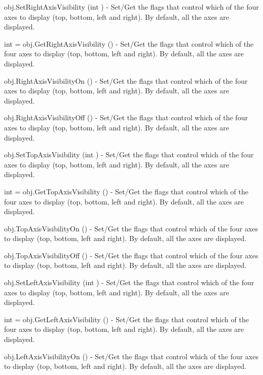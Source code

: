 \begin{DoxyItemize}
\item {\ttfamily obj.\-Set\-Right\-Axis\-Visibility (int )} -\/ Set/\-Get the flags that control which of the four axes to display (top, bottom, left and right). By default, all the axes are displayed.  
\item {\ttfamily int = obj.\-Get\-Right\-Axis\-Visibility ()} -\/ Set/\-Get the flags that control which of the four axes to display (top, bottom, left and right). By default, all the axes are displayed.  
\item {\ttfamily obj.\-Right\-Axis\-Visibility\-On ()} -\/ Set/\-Get the flags that control which of the four axes to display (top, bottom, left and right). By default, all the axes are displayed.  
\item {\ttfamily obj.\-Right\-Axis\-Visibility\-Off ()} -\/ Set/\-Get the flags that control which of the four axes to display (top, bottom, left and right). By default, all the axes are displayed.  
\item {\ttfamily obj.\-Set\-Top\-Axis\-Visibility (int )} -\/ Set/\-Get the flags that control which of the four axes to display (top, bottom, left and right). By default, all the axes are displayed.  
\item {\ttfamily int = obj.\-Get\-Top\-Axis\-Visibility ()} -\/ Set/\-Get the flags that control which of the four axes to display (top, bottom, left and right). By default, all the axes are displayed.  
\item {\ttfamily obj.\-Top\-Axis\-Visibility\-On ()} -\/ Set/\-Get the flags that control which of the four axes to display (top, bottom, left and right). By default, all the axes are displayed.  
\item {\ttfamily obj.\-Top\-Axis\-Visibility\-Off ()} -\/ Set/\-Get the flags that control which of the four axes to display (top, bottom, left and right). By default, all the axes are displayed.  
\item {\ttfamily obj.\-Set\-Left\-Axis\-Visibility (int )} -\/ Set/\-Get the flags that control which of the four axes to display (top, bottom, left and right). By default, all the axes are displayed.  
\item {\ttfamily int = obj.\-Get\-Left\-Axis\-Visibility ()} -\/ Set/\-Get the flags that control which of the four axes to display (top, bottom, left and right). By default, all the axes are displayed.  
\item {\ttfamily obj.\-Left\-Axis\-Visibility\-On ()} -\/ Set/\-Get the flags that control which of the four axes to display (top, bottom, left and right). By default, all the axes are displayed.  

\end{DoxyItemize}
